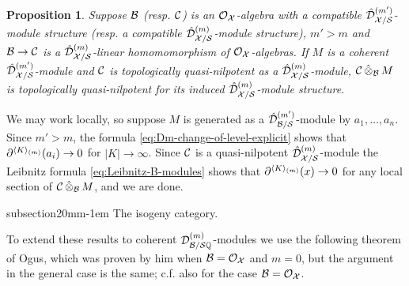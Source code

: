 \documentclass{article}
\makeatletter
\theoremstyle{change}
\newtheorem{prop}[subsubsection]{Proposition}
\renewcommand{\subsection}{\@startsection%
{subsection}{2}{0mm}{\baselineskip}{-1em}%
{\normalfont\normalsize\bfseries}}
\numberwithin{equation}{subsubsection}
\newcommand{\demobox}{\vrule height6pt width6pt depth0pt}
\newenvironment{demo}{\noindent{\it Proof.}}
{{\unskip\nobreak\hfil\qquad
\demobox\parfillskip=0pt\par}
\medskip}
\makeatother
\begin{document}
\begin{prop}\label{prop:quasi-nilpotence-and-base-change}
  Suppose ${\cal B}$ (resp. ${\cal C}$) is an ${\cal O}_{\cal X}$-algebra with a compatible
  ${\hat{\cal D}}^{({m'})}_{{\cal X}/{\cal S}}$-module structure (resp. a compatible
  ${\hat{\cal D}}^{({m})}_{{\cal X}/{\cal S}}$-module structure), $m'>m$ and ${\cal B}\to{\cal C}$
  is a ${\hat{\cal D}}^{({m})}_{{\cal X}/{\cal S}}$-linear homomomorphism of
  ${\cal O}_{\cal X}$-algebras. If $M$ is a coherent
  ${\hat{\cal D}}^{({m'})}_{{\cal X}/{\cal S}}$-module and ${\cal C}$ is topologically
  quasi-nilpotent as a ${\hat{\cal D}}^{({m})}_{{\cal X}/{\cal S}}$-module,
  ${\cal C}\mathop{\hat\otimes}_{\cal B} M$ is topologically quasi-nilpotent for its induced
  ${\hat{\cal D}}^{({m})}_{{\cal X}/{\cal S}}$-module structure.
\end{prop}
\begin{demo}
  We may work locally, so suppose $M$ is generated as a
  ${\hat{\cal D}}^{({m'})}_{{\cal B}/{\cal S}}$-module by $a_1,\ldots,a_n$. Since $m'>m$,
  the formula \ref{eq:Dm-change-of-level-explicit} shows that
  ${{\partial}}^{\langle{K}\rangle_{(m)}}(a_i)\to0$ for $|K|\to\infty$. Since ${\cal C}$ is a
  quasi-nilpotent ${\hat{\cal D}}^{({m})}_{{\cal X}/{\cal S}}$-module the Leibnitz formula
  \ref{eq:Leibnitz-B-modules} shows that ${{\partial}}^{\langle{K}\rangle_{(m)}}(x)\to0$
  for any local section of ${\cal C}\mathop{\hat\otimes}_{\cal B} M$, and we are done.
\end{demo}

\subsection{The isogeny category.}
\label{sec:isogeny-category}

To extend these results to coherent ${{\cal D}}^{({m})}_{{\cal B}/{\cal S}{\mathbb Q}}$-modules
we use the following theorem of Ogus, which was proven by him when
${\cal B}={\cal O}_{\cal X}$ and $m=0$, but the argument in the general case is the
same; c.f. also \cite[Prop. 3.1.2]{berthelot:1990} for the case
${\cal B}={\cal O}_{\cal X}$.
\end{document}
